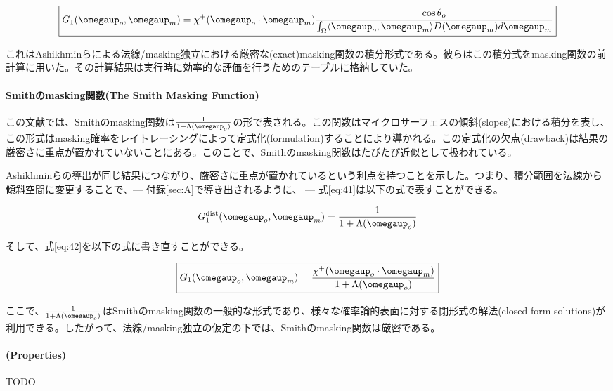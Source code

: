 \documentclass[a4j,xelatex,ja=standard]{bxjsarticle}
\begin{document}
\begin{equation}
    \boxed{
    G_1(\boldsymbol{\omegaup}_o, \boldsymbol{\omegaup}_m) = \chi^+(\boldsymbol{\omegaup}_o \cdot \boldsymbol{\omegaup}_m) \frac{\cos\theta_o}{\int_{\Omega} \langle \boldsymbol{\omegaup}_o, \boldsymbol{\omegaup}_m \rangle D(\boldsymbol{\omegaup}_m) d\boldsymbol{\omegaup}_m}
    }
    \label{eq:42}
\end{equation}

これはAshikhminらによる法線/masking独立における厳密な(exact)masking関数の積分形式である。彼らはこの積分式をmasking関数の前計算に用いた。その計算結果は実行時に効率的な評価を行うためのテーブルに格納していた。

\paragraph{Smithのmasking関数(The Smith Masking Function)}

この文献では、Smithのmasking関数は$\frac{1}{1 + \Lambda(\boldsymbol{\omegaup}_o)}$の形で表される。この関数はマイクロサーフェスの傾斜(slopes)における積分を表し、この形式はmasking確率をレイトレーシングによって定式化(formulation)することにより導かれる。この定式化の欠点(drawback)は結果の厳密さに重点が置かれていないことにある。このことで、Smithのmasking関数はたびたび近似として扱われている。

Ashikhminらの導出が同じ結果につながり、厳密さに重点が置かれているという利点を持つことを示した。つまり、積分範囲を法線から傾斜空間に変更することで、--- 付録\ref{sec:A}で導き出されるように、 --- 式\eqref{eq:41}は以下の式で表すことができる。

\begin{equation*}
    G_1^{\text{dist}}(\boldsymbol{\omegaup}_o, \boldsymbol{\omegaup}_m) = \frac{1}{1 + \Lambda(\boldsymbol{\omegaup}_o)}
\end{equation*}

そして、式\eqref{eq:42}を以下の式に書き直すことができる。

\begin{equation}
    \boxed{
    G_1(\boldsymbol{\omegaup}_o, \boldsymbol{\omegaup}_m) = \frac{\chi^+(\boldsymbol{\omegaup}_o \cdot \boldsymbol{\omegaup}_m)}{1 + \Lambda(\boldsymbol{\omegaup}_o)}
    }
    \label{eq:43}
\end{equation}

ここで、$\frac{1}{1 + \Lambda(\boldsymbol{\omegaup}_o)}$はSmithのmasking関数の一般的な形式であり、様々な確率論的表面に対する閉形式の解法(closed-form solutions)が利用できる。したがって、法線/masking独立の仮定の下では、Smithのmasking関数は厳密である。

\paragraph{(Properties)}

TODO
\end{document}
